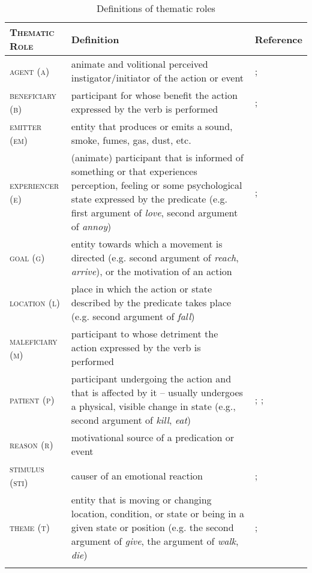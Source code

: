 \documentclass[output=paper]{langsci/langscibook}
\begin{document}
\begin{table}
\caption{Definitions of thematic roles}
\label{tab:sibanda:1}
\small
\begin{tabularx}{\textwidth}{>{\scshape}lXp{2cm}}
\lsptoprule
 \textup{Thematic Role} & {Definition} & {Reference}\\
\midrule
 {{agent (a)}} & {animate and volitional perceived instigator/initiator of the action or event} & {\citet{Fillmore1968}; \citet[49]{Payne1997}}\\
\tablevspace
 {{beneficiary (b)}} & {participant for whose benefit the action expressed by the verb is performed} & {\citet[11]{SaintDizierViegas1995}; \citet[4]{PalmerEtAl2010}}\\
\tablevspace
 {{emitter (em)}} & {entity that produces or emits a sound, smoke, fumes, gas, dust, etc.} & \\
\tablevspace
 {{experiencer (e)}} & {(animate) participant that is informed of something or that experiences perception, feeling or some psychological state expressed by the predicate (e.g. first argument of \textit{love}, second argument of \textit{annoy})} & {\citet[11]{SaintDizierViegas1995}; \citet[113]{Lobner2002}}\\
\tablevspace
 {{goal (g)}} & {entity towards which a movement is directed (e.g. second argument of \textit{reach}, \textit{arrive}), or the motivation of an action} & {\citet[11]{SaintDizierViegas1995}}\\
\tablevspace
 {{location (l)}} & {place in which the action or state described by the predicate takes place (e.g. second argument of \textit{fall})} & {\citet[11]{SaintDizierViegas1995}}\\
\tablevspace
 {{maleficiary (m)}} & {participant to whose detriment the action expressed by the verb is performed}  & \citep[5]{KittilaZuniga2010}\\
\tablevspace
 {{patient (p)}} & {participant undergoing the action and that is affected by it – usually undergoes a physical, visible change in state (e.g., second argument of \textit{kill}, \textit{eat})}  & {\citet[11]{SaintDizierViegas1995}; \citet[4]{PalmerEtAl2010}; \citet[51]{Payne1997}}\\
\tablevspace
 {{reason (r)}} & {motivational source of a predication or event} & {\citet[225]{Frawley1992}}\\
\tablevspace
 {{stimulus (sti)}} & {causer of an emotional reaction} & {\citet[13]{PalmerEtAl2010}; \citet{Dowty1991}}\\
\tablevspace
 {{theme (t)}} & {entity that is moving or changing location, condition, or state or being in a given state or position (e.g. the second argument of \textit{give}, the argument of \textit{walk}, \textit{die})} & {\citet[11]{SaintDizierViegas1995}; \citet[4]{PalmerEtAl2010}}\\
\lspbottomrule
\end{tabularx}
\end{table}
\end{document}
